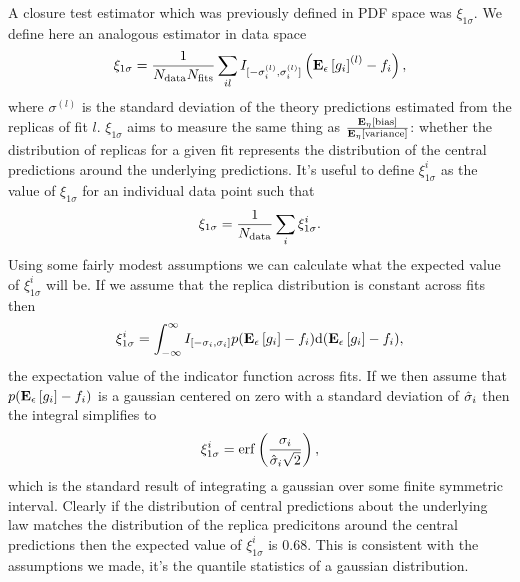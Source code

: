 A closure test estimator which was previously defined in PDF space was $\xi_{1\sigma}$.
We define here an analogous estimator in data space
\begin{equation}
    \xi_{1\sigma} = \frac{1}{N_{\rm data} N_{\rm fits}} \sum_{il}
    I_{[-\sigma_i^{(l)}, \sigma_i^{(l)}]}
    \left( \mathbf{E}_{\epsilon}\left[ g_i \right]^{(l)} - f_i \right),
\end{equation}
where $\sigma^{(l)}$ is the standard deviation of the theory predictions
estimated from the replicas of fit $l$. $\xi_{1\sigma}$ aims to measure the same
thing as $\frac{\mathbf{E}_{\eta}\left[ {\rm bias} \right]}{\mathbf{E}_{\eta}\left[ {\rm variance} \right]}$: whether the distribution of
replicas for a given fit represents the distribution of the central predictions
around the underlying predictions. It's useful to define $\xi_{1\sigma}^{i}$ as
the value of $\xi_{1\sigma}$ for an individual data point
such that
\begin{equation}
    \xi_{1\sigma} = \frac{1}{N_{\rm data}} \sum_i \xi_{1\sigma}^{i}.
\end{equation}
Using some fairly modest assumptions we can
calculate what the expected value of $\xi_{1\sigma}^i$ will be. If we assume that
the replica distribution is constant across
fits then
\begin{equation}
    \xi_{1\sigma}^{i} = \int_{-\infty}^{\infty} I_{[-\sigma_i, \sigma_i]}
    p(\mathbf{E}_{\epsilon}\left[ g_i \right] - f_i)
    {\rm d}(\mathbf{E}_{\epsilon}\left[ g_i \right] - f_i),
\end{equation}
the expectation value of the indicator function across fits.
If we then assume that $p(\mathbf{E}_{\epsilon}\left[ g_i \right] - f_i)$ is a gaussian centered on zero
with a standard deviation of $\hat{\sigma}_i$ then the integral simplifies to
\begin{equation}
    \xi_{1\sigma}^{i} = {\rm erf} \left( \frac{\sigma_i}{\hat{\sigma}_i \sqrt{2}}\right),
    \label{eq:expectedxi}
\end{equation}
which is the standard result of integrating a gaussian over some finite symmetric
interval. Clearly if the distribution of central predictions about the underlying law
matches the distribution of the replica predicitons around the central predictions
then the expected value of $\xi_{1\sigma}^{i}$ is 0.68. This is consistent with
the assumptions we made, it's the quantile statistics of a gaussian distribution.

